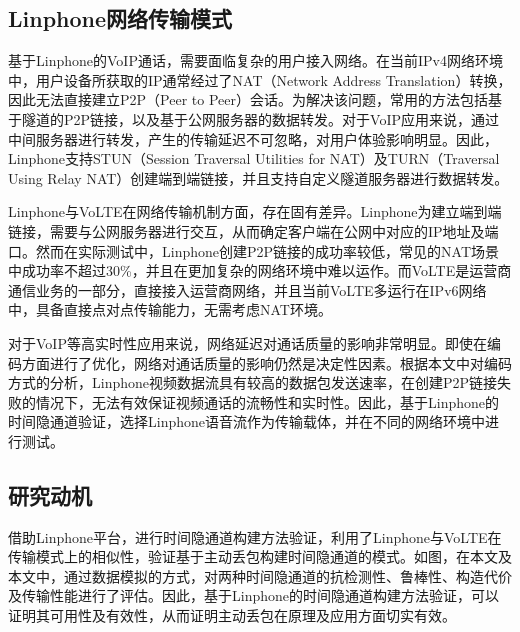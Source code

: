 \subsection{Linphone网络传输模式}
\label{chap:linphone:motivation:net}

基于Linphone的VoIP通话，需要面临复杂的用户接入网络。在当前IPv4网络环境中，用户设备所获取的IP通常经过了NAT（Network Address Translation）转换，因此无法直接建立P2P（Peer to Peer）会话。为解决该问题，常用的方法包括基于隧道的P2P链接，以及基于公网服务器的数据转发。对于VoIP应用来说，通过中间服务器进行转发，产生的传输延迟不可忽略，对用户体验影响明显。因此，Linphone支持STUN（Session Traversal Utilities for NAT）及TURN（Traversal Using Relay NAT）创建端到端链接，并且支持自定义隧道服务器进行数据转发。

Linphone与VoLTE在网络传输机制方面，存在固有差异。Linphone为建立端到端链接，需要与公网服务器进行交互，从而确定客户端在公网中对应的IP地址及端口。然而在实际测试中，Linphone创建P2P链接的成功率较低，常见的NAT场景中成功率不超过30\%，并且在更加复杂的网络环境中难以运作。而VoLTE是运营商通信业务的一部分，直接接入运营商网络，并且当前VoLTE多运行在IPv6网络中，具备直接点对点传输能力，无需考虑NAT环境。

对于VoIP等高实时性应用来说，网络延迟对通话质量的影响非常明显。即使在编码方面进行了优化，网络对通话质量的影响仍然是决定性因素。根据本文中对编码方式的分析，Linphone视频数据流具有较高的数据包发送速率，在创建P2P链接失败的情况下，无法有效保证视频通话的流畅性和实时性。因此，基于Linphone的时间隐通道验证，选择Linphone语音流作为传输载体，并在不同的网络环境中进行测试。

\subsection{研究动机}
\label{chap:linphone:motivation:sum}


借助Linphone平台，进行时间隐通道构建方法验证，利用了Linphone与VoLTE在传输模式上的相似性，验证基于主动丢包构建时间隐通道的模式。如图，在本文及本文中，通过数据模拟的方式，对两种时间隐通道的抗检测性、鲁棒性、构造代价及传输性能进行了评估。因此，基于Linphone的时间隐通道构建方法验证，可以证明其可用性及有效性，从而证明主动丢包在原理及应用方面切实有效。